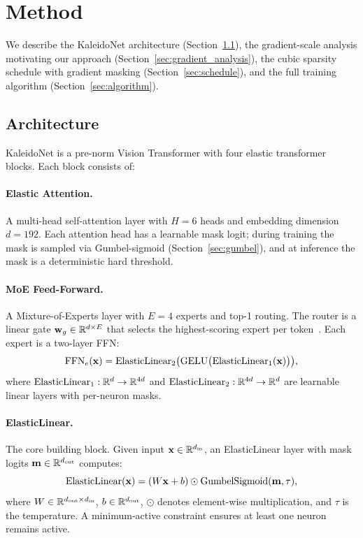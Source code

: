\section{Method}
\label{sec:method}

We describe the KaleidoNet architecture (Section~\ref{sec:arch}), the gradient-scale analysis motivating our approach (Section~\ref{sec:gradient_analysis}), the cubic sparsity schedule with gradient masking (Section~\ref{sec:schedule}), and the full training algorithm (Section~\ref{sec:algorithm}).

\subsection{Architecture}
\label{sec:arch}

KaleidoNet is a pre-norm Vision Transformer with four elastic transformer blocks. Each block consists of:

\paragraph{Elastic Attention.} A multi-head self-attention layer with $H{=}6$ heads and embedding dimension $d{=}192$. Each attention head has a learnable mask logit; during training the mask is sampled via Gumbel-sigmoid (Section~\ref{sec:gumbel}), and at inference the mask is a deterministic hard threshold.

\paragraph{MoE Feed-Forward.} A Mixture-of-Experts layer with $E{=}4$ experts and top-1 routing. The router is a linear gate $\mathbf{w}_g \in \mathbb{R}^{d \times E}$ that selects the highest-scoring expert per token~\citep{fedus2022switch}. Each expert is a two-layer FFN:
\begin{equation}
\text{FFN}_e(\mathbf{x}) = \text{ElasticLinear}_2\bigl(\text{GELU}\bigl(\text{ElasticLinear}_1(\mathbf{x})\bigr)\bigr),
\end{equation}
where $\text{ElasticLinear}_1: \mathbb{R}^d \to \mathbb{R}^{4d}$ and $\text{ElasticLinear}_2: \mathbb{R}^{4d} \to \mathbb{R}^d$ are learnable linear layers with per-neuron masks.

\paragraph{ElasticLinear.} The core building block. Given input $\mathbf{x} \in \mathbb{R}^{d_{\text{in}}}$, an ElasticLinear layer with mask logits $\mathbf{m} \in \mathbb{R}^{d_{\text{out}}}$ computes:
\begin{equation}
\label{eq:elastic}
\text{ElasticLinear}(\mathbf{x}) = (W\mathbf{x} + b) \odot \text{GumbelSigmoid}(\mathbf{m}, \tau),
\end{equation}
where $W \in \mathbb{R}^{d_{\text{out}} \times d_{\text{in}}}$, $b \in \mathbb{R}^{d_{\text{out}}}$, $\odot$ denotes element-wise multiplication, and $\tau$ is the temperature. A minimum-active constraint ensures at least one neuron remains active.

